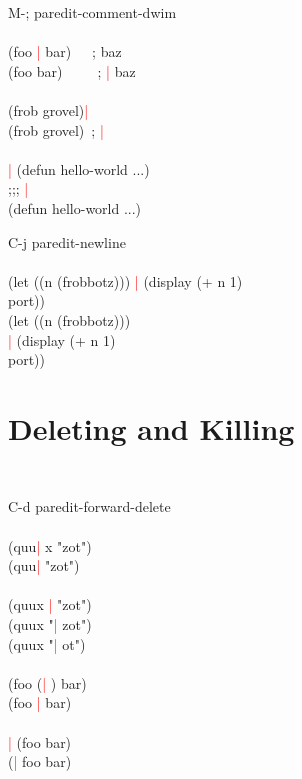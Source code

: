 \documentclass[8pt,a4paper,landscape]{extarticle}
\newcommand{\csr}{\textcolor{red}{| }}
\begin{document}
\begin{multicols}{4}
\begin{eqlist}
\item[M-;] paredit-comment-dwim\\
  \\
  (foo \csr bar)~~~; baz\\
  (foo bar)~~~~~; \csr baz\\
  \\
  (frob grovel)\csr \\
  (frob grovel)~; \csr \\
  \\
  \csr (defun hello-world ...)\\
  ;;; \csr \\
  (defun hello-world ...)\\


\item[C-j] paredit-newline\\
  \\
  (let ((n (frobbotz))) \csr (display (+ n 1)\\
  port))\\
  (let ((n (frobbotz)))\\
  \csr (display (+ n 1)\\
  port))\\
\end{eqlist}

\section{Deleting and Killing}
\begin{eqlist}
  \tt
\item[C-d] paredit-forward-delete\\
  \\
  (quu\csr x "zot")\\
  (quu\csr  "zot")\\
  \\
  (quux \csr "zot")\\
  (quux "\csr zot")\\
  (quux "\csr ot")\\
  \\
  (foo (\csr ) bar)\\
  (foo \csr  bar)\\
  \\
  \csr (foo bar)\\
  (\csr foo bar)\\



\end{eqlist}
\end{multicols}
\end{document}
